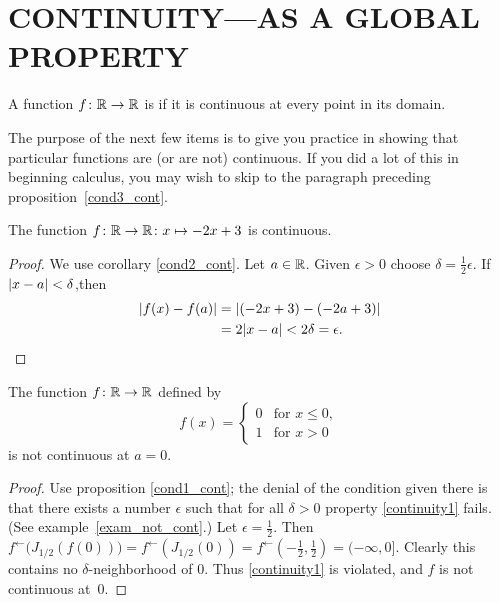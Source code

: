 \section{CONTINUITY---AS A GLOBAL PROPERTY}
\begin{defn} A function $f\colon\mathbb{R} \rightarrow \mathbb{R}$ is
 if it is continuous at every point in its domain.
\end{defn}

The purpose of the next few items is to give you practice in showing that particular functions
are (or are not) continuous.  If you did a lot of this in beginning calculus, you may wish to
skip to the paragraph preceding proposition~\ref{cond3_cont}.

\begin{exam}\label{cont_exam1} The function $f\colon\mathbb{R} \rightarrow \mathbb{R}\colon x \mapsto -2x + 3$ is
continuous.
\end{exam}

\begin{proof} We use corollary \ref{cond2_cont}.  Let $a \in \mathbb{R}$. Given $\epsilon > 0$ choose
$\delta = \frac12 \epsilon$. If $\lvert x - a\rvert <  \delta$,then
  \begin{align*} \lvert f(x)-f(a)\rvert &= \lvert(-2x + 3) - (-2a + 3)\rvert \\
                                 &= 2\lvert x - a\rvert < 2\delta = \epsilon.
  \end{align*}
\end{proof}

\begin{exam} The function $f\colon\mathbb{R} \rightarrow \mathbb{R}$ defined by
 \[f(x) = \begin{cases} 0  &\text{for $x \le 0$}, \\
                       1   &\text{for $x > 0$}  \end{cases}\]
is not continuous at $a = 0$.
\end{exam}

\begin{proof} Use proposition \ref{cond1_cont}; the denial of the condition given there is
that there exists a number $\epsilon$ such that for all $\delta > 0$ property
\ref{continuity1} fails. (See example~\ref{exam_not_cont}.)  Let $\epsilon = \frac12$. Then
$f^\gets\bigl(J_{1/2}(f(0))\bigr) = f^\gets(J_{1/2}(0)) = f^\gets(-\frac12, \frac12) =
(-\infty, 0]$.  Clearly this contains no $\delta$-neighborhood of $0$.  Thus \ref{continuity1}
is violated, and $f$ is not continuous at~$0$.
\end{proof}

